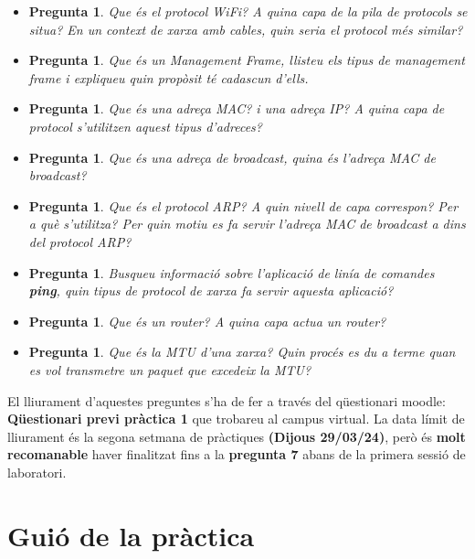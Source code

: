 \documentclass[12pt,a4paper]{article}
\newcounter{exercises}
\newtheorem{exer}[exercises]{Pregunta}
\begin{document}
\begin{itemize}
\item \begin{exer} Que és el protocol WiFi? A quina capa de la pila de protocols se situa? En un context de xarxa amb cables, quin seria el protocol més similar?\end{exer}
\item \begin{exer} Que és un Management Frame, llisteu els tipus de management frame i expliqueu quin propòsit té cadascun d'ells. \end{exer}
\item \begin{exer} Que és una adreça MAC? i una adreça IP? A quina capa de protocol s'utilitzen aquest tipus d'adreces? \end{exer}
\item \begin{exer} Que és una adreça de broadcast, quina és l'adreça MAC de broadcast? \end{exer}
\item \begin{exer} Que és el protocol ARP? A quin nivell de capa correspon? Per a què s'utilitza? Per quin motiu es fa servir l'adreça MAC de broadcast a dins del protocol ARP?  \end{exer}
\item \begin{exer} Busqueu informació sobre l'aplicació de linía de comandes \textbf{ping}, quin tipus de protocol de xarxa fa servir aquesta aplicació? \end{exer}
\item \begin{exer} Que és un router? A quina capa actua un router? \end{exer}
\item \begin{exer} Que és la MTU d'una xarxa? Quin procés es du a terme quan es vol transmetre un paquet
que excedeix la MTU?\end{exer}
\end{itemize}

El lliurament d'aquestes preguntes s'ha de fer a través del qüestionari moodle: \textbf{Qüestionari previ pràctica 1} que trobareu al campus virtual. La data límit de lliurament és la segona setmana de pràctiques \textbf{(Dijous 29/03/24)}, però és \textbf{molt recomanable} haver finalitzat fins a la \textbf{pregunta 7} abans de la primera sessió de laboratori.

\section{Guió de la pràctica}
\end{document}
